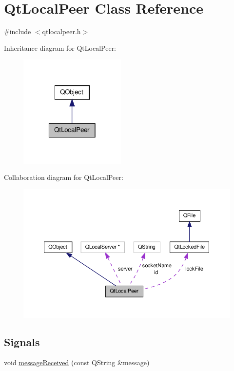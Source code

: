 \hypertarget{class_qt_local_peer}{\section{Qt\-Local\-Peer Class Reference}
\label{class_qt_local_peer}
}


{\ttfamily \#include $<$qtlocalpeer.\-h$>$}



Inheritance diagram for Qt\-Local\-Peer\-:
\nopagebreak
\begin{figure}[H]
\begin{center}
\leavevmode
\includegraphics[width=150pt]{class_qt_local_peer__inherit__graph}
\end{center}
\end{figure}


Collaboration diagram for Qt\-Local\-Peer\-:
\nopagebreak
\begin{figure}[H]
\begin{center}
\leavevmode
\includegraphics[width=350pt]{class_qt_local_peer__coll__graph}
\end{center}
\end{figure}
\subsection*{Signals}
\begin{DoxyCompactItemize}
\item 
void \hyperlink{class_qt_local_peer_a4436ad976edb6f177de1300b5aab9bfe}{message\-Received} (const Q\-String \&message)
\end{DoxyCompactItemize}
